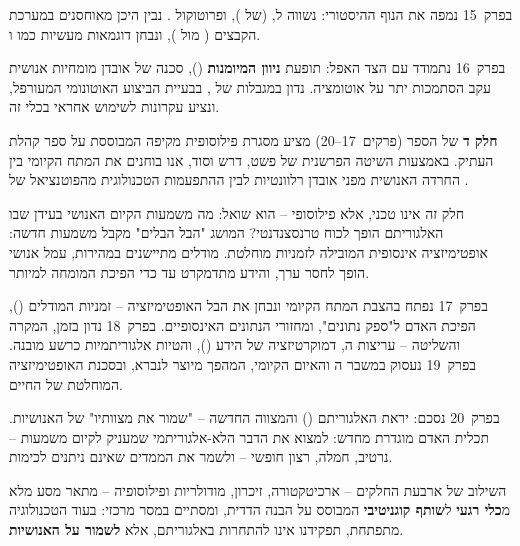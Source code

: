 בפרק~\num{15} נמפה את הנוף ההיסטורי: נשווה  ל,  (של ), ופרוטוקול . נבין היכן מאוחסנים  במערכת הקבצים ( מול ), ונבחן דוגמאות מעשיות כמו  ו.

בפרק~\num{16} נתמודד עם הצד האפל: תופעת \textbf{ניוון המיומנות} (), סכנה של אובדן מומחיות אנושית עקב הסתמכות יתר על אוטומציה. נדון במגבלות של , בבעיית הביצוע האוטונומי המעורפל, ונציע עקרונות לשימוש אחראי בכלי זה.


\textbf{חלק ד} של הספר (פרקים~\num{17}--\num{20}) מציע מסגרת פילוסופית מקיפה המבוססת על ספר קהלת העתיק. באמצעות השיטה הפרשנית של פשט, דרש וסוד, אנו בוחנים את המתח הקיומי בין החרדה האנושית מפני אובדן רלוונטיות לבין ההתפעמות הטכנולוגית מהפוטנציאל של .

חלק זה אינו טכני, אלא פילוסופי – הוא שואל: מה משמעות הקיום האנושי בעידן שבו האלגוריתם הופך לכוח טרנסצנדנטי? המושג "הבל הבלים" מקבל משמעות חדשה: אופטימיזציה אינסופית המובילה לזמניות מוחלטת. מודלים מתיישנים במהירות, עמל אנושי הופך לחסר ערך, והידע מתדמקרט עד כדי הפיכת המומחה למיותר.

בפרק~\num{17} נפתח בהצבת המתח הקיומי ונבחן את הבל האופטימיזציה – זמניות המודלים (), הפיכת האדם ל"ספק נתונים", ומחזורי הנתונים האינסופיים. בפרק~\num{18} נדון בזמן, המקרה והשליטה – עריצות ה, דמוקרטיזציה של הידע (), והטיות אלגוריתמיות כרשע מובנה. בפרק~\num{19} נעסוק במשבר ה והאיום הקיומי, המהפך מיוצר לנברא, ובסכנת האופטימיזציה המוחלטת של החיים.

בפרק~\num{20} נסכם: יראת האלגוריתם () והמצווה החדשה – "שמור את מצוותיו" של האנושיות. תכלית האדם מוגדרת מחדש: למצוא את הדבר הלא-אלגוריתמי שמעניק לקיום משמעות – נרטיב, חמלה, רצון חופשי – ולשמר את הממדים שאינם ניתנים לכימות.

השילוב של ארבעת החלקים – ארכיטקטורה, זיכרון, מודולריות ופילוסופיה – מתאר מסע מלא מ\textbf{כלי רגעי} ל\textbf{שותף קוגניטיבי} המבוסס על הבנה הדדית, ומסתיים במסר מרכזי: בעוד הטכנולוגיה מתפתחת, תפקידנו אינו להתחרות באלגוריתם, אלא \textbf{לשמור על האנושיות}.
